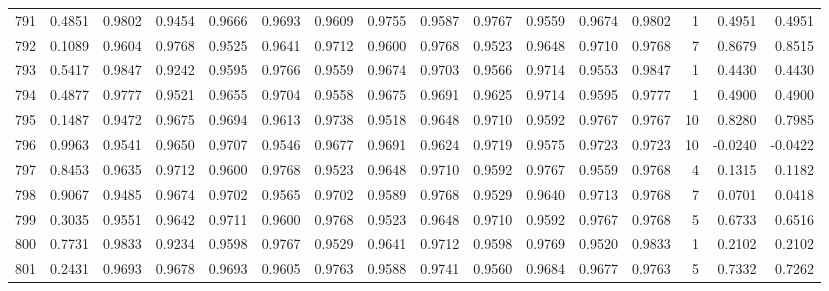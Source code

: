 \begin{tabular}{lrrrrrrrrrrrrrrr}
791 &      0.4851 &  0.9802 &  0.9454 &  0.9666 &  0.9693 &  0.9609 &  0.9755 &  0.9587 &  0.9767 &  0.9559 &   0.9674 &     0.9802 &      1 &                    0.4951 &                     0.4951 \\
792 &      0.1089 &  0.9604 &  0.9768 &  0.9525 &  0.9641 &  0.9712 &  0.9600 &  0.9768 &  0.9523 &  0.9648 &   0.9710 &     0.9768 &      7 &                    0.8679 &                     0.8515 \\
793 &      0.5417 &  0.9847 &  0.9242 &  0.9595 &  0.9766 &  0.9559 &  0.9674 &  0.9703 &  0.9566 &  0.9714 &   0.9553 &     0.9847 &      1 &                    0.4430 &                     0.4430 \\
794 &      0.4877 &  0.9777 &  0.9521 &  0.9655 &  0.9704 &  0.9558 &  0.9675 &  0.9691 &  0.9625 &  0.9714 &   0.9595 &     0.9777 &      1 &                    0.4900 &                     0.4900 \\
795 &      0.1487 &  0.9472 &  0.9675 &  0.9694 &  0.9613 &  0.9738 &  0.9518 &  0.9648 &  0.9710 &  0.9592 &   0.9767 &     0.9767 &     10 &                    0.8280 &                     0.7985 \\
796 &      0.9963 &  0.9541 &  0.9650 &  0.9707 &  0.9546 &  0.9677 &  0.9691 &  0.9624 &  0.9719 &  0.9575 &   0.9723 &     0.9723 &     10 &                   -0.0240 &                    -0.0422 \\
797 &      0.8453 &  0.9635 &  0.9712 &  0.9600 &  0.9768 &  0.9523 &  0.9648 &  0.9710 &  0.9592 &  0.9767 &   0.9559 &     0.9768 &      4 &                    0.1315 &                     0.1182 \\
798 &      0.9067 &  0.9485 &  0.9674 &  0.9702 &  0.9565 &  0.9702 &  0.9589 &  0.9768 &  0.9529 &  0.9640 &   0.9713 &     0.9768 &      7 &                    0.0701 &                     0.0418 \\
799 &      0.3035 &  0.9551 &  0.9642 &  0.9711 &  0.9600 &  0.9768 &  0.9523 &  0.9648 &  0.9710 &  0.9592 &   0.9767 &     0.9768 &      5 &                    0.6733 &                     0.6516 \\
800 &      0.7731 &  0.9833 &  0.9234 &  0.9598 &  0.9767 &  0.9529 &  0.9641 &  0.9712 &  0.9598 &  0.9769 &   0.9520 &     0.9833 &      1 &                    0.2102 &                     0.2102 \\
801 &      0.2431 &  0.9693 &  0.9678 &  0.9693 &  0.9605 &  0.9763 &  0.9588 &  0.9741 &  0.9560 &  0.9684 &   0.9677 &     0.9763 &      5 &                    0.7332 &                     0.7262 \\

\end{tabular}
